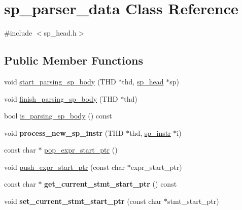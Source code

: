 \hypertarget{classsp__parser__data}{}\section{sp\+\_\+parser\+\_\+data Class Reference}
\label{classsp__parser__data}


{\ttfamily \#include $<$sp\+\_\+head.\+h$>$}

\subsection*{Public Member Functions}
\begin{DoxyCompactItemize}
\item 
void \mbox{\hyperlink{classsp__parser__data_a2d911e54b0127570092c3aaabd7a989e}{start\+\_\+parsing\+\_\+sp\+\_\+body}} (T\+HD $\ast$thd, \mbox{\hyperlink{classsp__head}{sp\+\_\+head}} $\ast$sp)
\item 
void \mbox{\hyperlink{classsp__parser__data_af738f001cac1cf6ae2df63556a71184d}{finish\+\_\+parsing\+\_\+sp\+\_\+body}} (T\+HD $\ast$thd)
\item 
bool \mbox{\hyperlink{classsp__parser__data_a699c459aa777584cb6596fe00d20cd88}{is\+\_\+parsing\+\_\+sp\+\_\+body}} () const
\item 
\mbox{\label{classsp__parser__data_a79932972dc0df031deee939ed941bde4}} 
void {\bfseries process\+\_\+new\+\_\+sp\+\_\+instr} (T\+HD $\ast$thd, \mbox{\hyperlink{classsp__instr}{sp\+\_\+instr}} $\ast$i)
\item 
const char $\ast$ \mbox{\hyperlink{classsp__parser__data_a4665278dcaa28b14d1f3d4ae88694f66}{pop\+\_\+expr\+\_\+start\+\_\+ptr}} ()
\item 
void \mbox{\hyperlink{classsp__parser__data_a77dfbb5239b57530590b027d237f7ef9}{push\+\_\+expr\+\_\+start\+\_\+ptr}} (const char $\ast$expr\+\_\+start\+\_\+ptr)
\item 
\mbox{\label{classsp__parser__data_a0a46626b49bb618bdc9d958c1e4316dc}} 
const char $\ast$ {\bfseries get\+\_\+current\+\_\+stmt\+\_\+start\+\_\+ptr} () const
\item 
\mbox{\label{classsp__parser__data_a90e347ac665cefda282954e6a288b359}} 
void {\bfseries set\+\_\+current\+\_\+stmt\+\_\+start\+\_\+ptr} (const char $\ast$stmt\+\_\+start\+\_\+ptr)
\item 

\end{DoxyCompactItemize}
